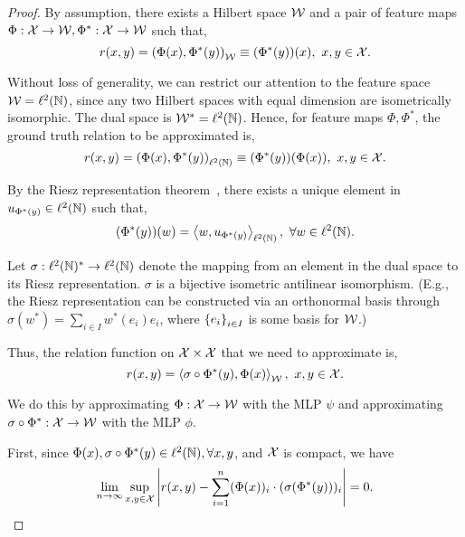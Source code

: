 \begin{proof}
    By assumption, there exists a Hilbert space ${\mathcal{W}}$ and a pair of feature maps $\Phi: {\mathcal{X}} \to {\mathcal{W}}, \Phi^*: {\mathcal{X}} \to {\mathcal{W}}$ such that,
    \begin{equation*}
        r(x, y) = \paren{\Phi(x), \Phi^*(y)}_{\calW} \equiv (\Phi^*(y))(x), \ x, y \in \calX.
    \end{equation*}

    Without loss of generality, we can restrict our attention to the feature space ${\mathcal{W}} = \ell^2({\mathbb{N}})$, since any two Hilbert spaces with equal dimension are isometrically isomorphic. The dual space is ${\mathcal{W}}^* = \ell^2({\mathbb{N}})$. Hence, for feature maps $\Phi, \Phi^*$, the ground truth relation to be approximated is,
    \begin{equation*}
        r(x, y) = \paren{\Phi(x), \Phi^*(y)}_{\ell^2(\bbN)} \equiv (\Phi^*(y))(\Phi(x)), \ x, y \in \calX.
    \end{equation*}

    By the Riesz representation theorem~\parencite{riesz_citation}, there exists a unique element in $u_{\Phi^*(y)} \in \ell^2({\mathbb{N}})$ such that,
    \begin{equation*}
        (\Phi^*(y))(w) = \iprod{w}{u_{\Phi^*(y)}}_{\ell^2(\bbN)}, \ \forall w \in \ell^2(\bbN).
    \end{equation*}

    Let $\sigma: \ell^2({\mathbb{N}})^* \to \ell^2({\mathbb{N}})$ denote the mapping from an element in the dual space to its Riesz representation. $\sigma$ is a bijective isometric antilinear isomorphism. (E.g., the Riesz representation can be constructed via an orthonormal basis through $\sigma(w^*) = \sum_{i \in I} w^{*}(e_i) e_i$, where $\left\{e_i\right\}_{i \in I}$ is some basis for ${\mathcal{W}}$.)

    Thus, the relation function on ${\mathcal{X}} \times {\mathcal{X}}$ that we need to approximate is,
    \begin{equation*}
        r(x, y) = \iprod{\sigma \circ \Phi^* (y)}{\Phi(x)}_{\calW}, \ x, y \in \calX.
    \end{equation*}

    We do this by approximating $\Phi: {\mathcal{X}} \to {\mathcal{W}}$ with the MLP $\psi$ and approximating $\sigma \circ \Phi^*: {\mathcal{X}} \to {\mathcal{W}}$ with the MLP $\phi$.

    First, since $\Phi(x), \sigma \circ \Phi^*(y) \in \ell^2({\mathbb{N}}), \forall x, y$, and ${\mathcal{X}}$ is compact, we have
    \begin{equation*}
        \lim_{n \to \infty} \sup_{x,y \in \calX} \abs{r(x, y) - \sum_{i=1}^{n} (\Phi(x))_i \cdot (\sigma(\Phi^*(y)))_i} = 0.
    \end{equation*}


\end{proof}
